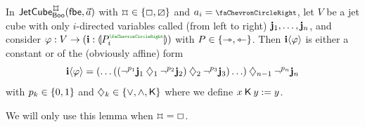\documentclass[a4paper]{memoir}
\begin{document}
\begin{lemma} \label{thm:char-twisted-cube-to-line}
	In $\jetcubetri \mycubex \booleanalg {\vec a}$ with $\mycubex \in \accol{\affine, \cartes}$ and $a_i = \ypolar$, let $V$ be a jet cube with only $i$-directed variables called (from left to right) $\mathbf{j}_1, \ldots, \mathbf{j}_n$, and consider $\vfi : V \to (\dm i : \rival{P_i\pmr{\ypolar}})$ with $P \in \mathopen{}\left\{ \rightarrowtriangle, \leftarrowtriangle \right\}\mathclose{}$.
	Then $\mathbf{i} \langle \varphi \rangle$ is either a constant or of the (obviously affine) form
	\[
		\mathbf{i} \langle \varphi \rangle = (\ldots((\lnot^{p_1} \mathbf{j}_1 \mathbin{\diamondsuit}_1 \lnot^{p_2} \mathbf{j}_2) \mathbin{\diamondsuit}_2 \lnot^{p_3} \mathbf{j}_3) \ldots) \mathbin{\diamondsuit}_{n-1} \lnot^{p_n} \mathbf{j}_n
	\]
	with $p_k \in \mathopen{}\left\{ 0, 1 \right\}\mathclose{}$ and $\mathbin{\diamondsuit}_k \in \mathopen{}\left\{ {\vee}, {\wedge}, {\mathbin{\mathsf{K}}} \right\}\mathclose{}$ where we define $x \mathbin{\mathsf{K}} y := y$.
\end{lemma}
We will only use this lemma when $\mycubex = \affine$.
\end{document}
